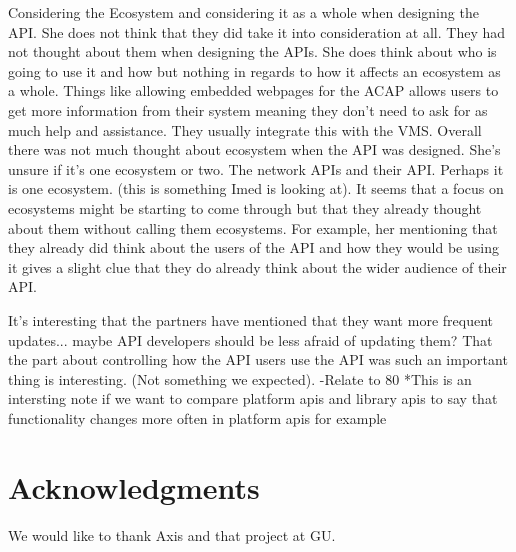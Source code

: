 \documentclass{sig-alternate}
\begin{document}
Considering the Ecosystem and considering it as a whole when designing the API. She does not think that they did take it into consideration at all. They had not thought about them when designing the APIs. She does think about who is going to use it and how but nothing in regards to how it affects an ecosystem as a whole. Things like allowing embedded webpages for the ACAP allows users to get more information from their system meaning they don’t need to ask for as much help and assistance. They usually integrate this with the VMS. Overall there was not much thought about ecosystem when the API was designed. She’s unsure if it’s one ecosystem or two. The network APIs and their API. Perhaps it is one ecosystem. (this is something Imed is looking at).
It seems that a focus on ecosystems might be starting to come through but that they already thought about them without calling them ecosystems. For example, her mentioning that they already did think about the users of the API and how they would be using it gives a slight clue that they do already think about the wider audience of their API.



It's interesting that the partners have mentioned that they want more frequent updates... maybe API developers should be less afraid of updating them? 
That the part about controlling how the API users use the API was such an important thing is interesting. (Not something we expected). 
-Relate to 80%
*This is an intersting note if we want to compare platform apis and library apis to say that functionality changes more often in platform apis for example




\section{Acknowledgments}
We would like to thank Axis and that project at GU. 


 
\end{document}

